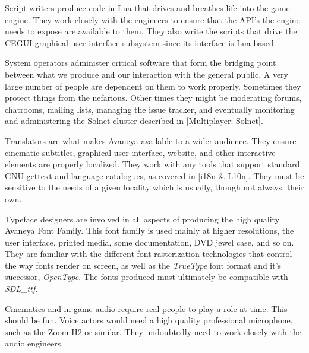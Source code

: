 
Script writers produce code in Lua that drives and breathes life into the game engine. They work closely with the engineers to ensure that the API's the engine needs to expose are available to them. They also write the scripts that drive the CEGUI graphical user interface subsystem since its interface is Lua based.


System operators administer critical software that form the bridging point between what we produce and our interaction with the general public. A very large number of people are dependent on them to work properly. Sometimes they protect things from the nefarious. Other times they might be moderating forums, chatrooms, mailing lists, managing the issue tracker, and eventually monitoring and administering the Solnet cluster described in [Multiplayer: Solnet].


Translators are what makes Avaneya available to a wider audience. They ensure cinematic subtitles, graphical user interface, website, and other interactive elements are properly localized. They work with any tools that support standard GNU gettext and language catalogues, as covered in [i18n & L10n]. They must be sensitive to the needs of a given locality which is usually, though not always, their own.


Typeface designers are involved in all aspects of producing the high quality Avaneya Font Family. This font family is used mainly at higher resolutions, the user interface, printed media, some documentation, DVD jewel case, and so on. They are familiar with the different font rasterization technologies that control the way fonts render on screen, as well as the {\it TrueType} font format and it's successor, {\it OpenType}. The fonts produced must ultimately be compatible with {\it SDL_ttf}.


Cinematics and in game audio require real people to play a role at time. This should be fun. Voice actors would need a high quality professional microphone, such as the Zoom H2 or similar. They undoubtedly need to work closely with the audio engineers.


